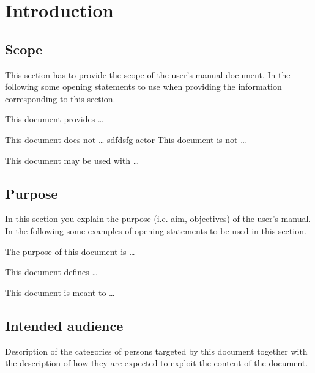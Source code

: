 \chapter{Introduction}
\label{chap:introduction}

\section{Scope}
This section has to provide the scope of the user's manual document.
In the following some opening statements to use when providing the
information corresponding to this section.

This document provides \ldots


This document does not \ldots 
 sdfdsfg   \gls{actor} 
This document is not \ldots 

 
This document may be used with \ldots




\section{Purpose}
In this section you explain the purpose (i.e. aim, objectives) of the user's
manual. In the following some examples of opening statements to be used in this
section.

The purpose of this document is \ldots

This document defines \ldots

This document is meant to \ldots



\section{Intended audience}
Description of the categories of persons targeted by this document together with the description of how they are expected to exploit the content of the document.


